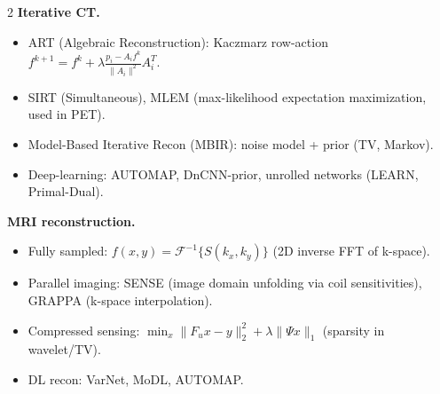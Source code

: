 \begin{paracol}{2}
\textbf{Iterative CT.}
\begin{itemize}[leftmargin=*,nosep]
  \item ART (Algebraic Reconstruction): Kaczmarz row-action $f^{k+1}=f^k+\lambda \frac{p_i-A_i f^k}{\|A_i\|^2}A_i^T$.
  \item SIRT (Simultaneous), MLEM (max-likelihood expectation maximization, used in PET).
  \item Model-Based Iterative Recon (MBIR): noise model + prior (TV, Markov).
  \item Deep-learning: AUTOMAP, DnCNN-prior, unrolled networks (LEARN, Primal-Dual).
\end{itemize}

\textbf{MRI reconstruction.}
\begin{itemize}[leftmargin=*,nosep]
  \item Fully sampled: $f(x,y)=\mathcal F^{-1}\{S(k_x,k_y)\}$ (2D inverse FFT of k-space).
  \item Parallel imaging: SENSE (image domain unfolding via coil sensitivities), GRAPPA (k-space interpolation).
  \item Compressed sensing: $\min_x \|F_u x-y\|_2^2 + \lambda\|\Psi x\|_1$ (sparsity in wavelet/TV).
  \item DL recon: VarNet, MoDL, AUTOMAP.
\end{itemize}


\end{paracol}
